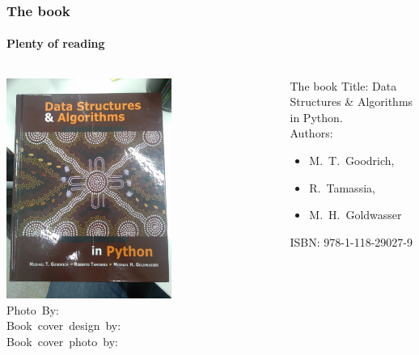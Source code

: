 \begin{frame}
	\frametitle{The book}
	\framesubtitle{Plenty of reading}
	\begin{columns}
				\begin{center}
					\includegraphics[width=0.62\textwidth]{figures/book.jpg}\\
					\hspace*{15pt}\hbox{\scriptsize Photo By:}\\
					\hspace*{15pt}\hbox{\scriptsize Book cover design by:}\\
					\hspace*{15pt}\hbox{\scriptsize Book cover photo by:}
				\end{center}
		\begin{block}{The book}
			Title: Data Structures \& Algorithms in Python.\\
			Authors: 
			\begin{itemize}
				\item M.\ T.\ Goodrich, 
				\item R.\ Tamassia, 
				\item M.\ H.\ Goldwasser
			\end{itemize}
			ISBN: 978-1-118-29027-9
			\end{block}	
			
	\end{columns}
\end{frame}


